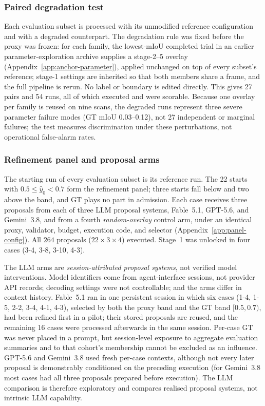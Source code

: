 \documentclass[a4paper,fleqn]{cas-dc}
\begin{document}
\subsubsection{Paired degradation test}
\label{sec:stress-test}

Each evaluation subset is processed with its unmodified reference configuration and with a degraded counterpart. The degradation rule was fixed before the proxy was frozen: for each family, the lowest-mIoU completed trial in an earlier parameter-exploration archive supplies a stage-2--5 overlay (Appendix~\ref{app:anchor-parameter}), applied unchanged on top of every subset's reference; stage-1 settings are inherited so that both members share a frame, and the full pipeline is rerun. No label or boundary is edited directly. This gives 27 pairs and 54 runs, all of which executed and were scorable. Because one overlay per family is reused on nine scans, the degraded runs represent three severe parameter failure modes (GT mIoU 0.03--0.12), not 27 independent or marginal failures; the test measures discrimination under these perturbations, not operational false-alarm rates.

\subsubsection{Refinement panel and proposal arms}
\label{sec:poc-protocol}

The starting run of every evaluation subset is its reference run. The 22 starts with $0.5\le\hat y_0<0.7$ form the refinement panel; three starts fall below and two above the band, and GT plays no part in admission. Each case receives three proposals from each of three LLM proposal systems, Fable~5.1, GPT-5.6, and Gemini~3.8, and from a fourth \emph{random-overlay} control arm, under an identical proxy, validator, budget, execution code, and selector (Appendix~\ref{app:panel-config}). All $264$ proposals ($22\times3\times4$) executed. Stage~1 was unlocked in four cases (3-4, 3-8, 3-10, 4-3).

The LLM arms are \emph{session-attributed proposal systems}, not verified model interventions. Model identifiers come from agent-interface sessions, not provider API records; decoding settings were not controllable; and the arms differ in context history. Fable~5.1 ran in one persistent session in which six cases (1-4, 1-5, 2-2, 3-4, 4-1, 4-3), selected by both the proxy band and the GT band $[0.5,0.7)$, had been refined first in a pilot; their stored proposals are reused, and the remaining 16 cases were processed afterwards in the same session. Per-case GT was never placed in a prompt, but session-level exposure to aggregate evaluation summaries and to that cohort's membership cannot be excluded as an influence. GPT-5.6 and Gemini~3.8 used fresh per-case contexts, although not every later proposal is demonstrably conditioned on the preceding execution (for Gemini~3.8 most cases had all three proposals prepared before execution). The LLM comparison is therefore exploratory and compares realised proposal systems, not intrinsic LLM capability.
\end{document}
